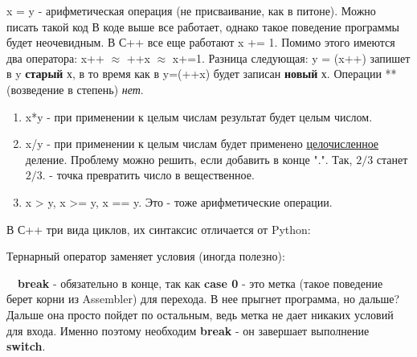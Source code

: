 \begin{lecture}[\lectureSubject]
\begin{lecSection}[Синтаксис]
	\end{lecSection}
	\begin{lecSection}
		x = y - арифметическая операция (не присваивание, как в питоне). Можно писать такой код
		В коде выше все работает, однако такое поведение программы будет неочевидным.
		В С++ все еще работают x += 1. Помимо этого имеются два оператора: x++ $\approx$ ++x $\approx$ x+=1.
		Разница следующая: y = (x++) запишет в y \textbf{старый} х, в то время как в y=(++x) будет записан \textbf{новый} х. Операции ** (возведение в степень) \textit{нет}.
		\begin{enumerate}
			\item x*y - при применении к целым числам результат будет целым числом.
			\item x/y - при применении к целым числам будет применено \underline{целочисленное} деление. Проблему можно решить, если добавить в конце ".". Так, $2/3$ станет $2/3.$ - точка превратить число в вещественное.
			\item x > y, x >= y, x == y. Это - тоже арифметические операции.
		\end{enumerate}
	\end{lecSection}
	\begin{lecSection}
		В С++ три вида циклов, их синтаксис отличается от Python:
	\end{lecSection}
	\begin{lecSection}
		Тернарный оператор заменяет условия (иногда полезно):
	\end{lecSection}
	\begin{lecSection}
		~~\textbf{break} - обязательно в конце, так как \textbf{case 0} - это метка (такое поведение берет корни из Assembler) для перехода. В нее прыгнет программа, но дальше? Дальше она просто пойдет по остальным, ведь метка не дает никаких условий для входа. Именно поэтому необходим \textbf{break} - он завершает выполнение \textbf{switch}.
	\end{lecSection}
\end{lecture}
